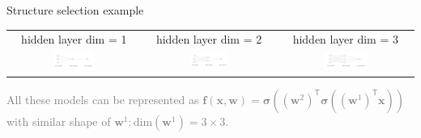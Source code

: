 \documentclass[usenames,dvipsnames,11pt,pdf,utf8,russian,aspectratio=169]{beamer}
\begin{document}
\begin{frame}{Structure selection example}
    \begin{table}
        \centering
        \begin{tabular}{ccc}
            hidden layer dim = 1 &   hidden layer dim = 2 &  hidden layer dim = 3 \\
             \includegraphics[width=0.33\textwidth]{1node.png} &  \includegraphics[width=0.3\textwidth]{2node.png} &  \includegraphics[width=0.33\textwidth]{3node.png} \\
        \end{tabular}


    \end{table}
    \textcolor{gray}{All these models can be represented as $\mathbf{f}(\mathbf{x}, \mathbf{w}) = \boldsymbol{\sigma}\left(\left(\mathbf{w}^2\right)^\mathsf{T}\boldsymbol{\sigma}\left((\mathbf{w}^1)^\mathsf{T}\mathbf{x}\right)\right)$ \\with similar shape of $\mathbf{w}^1: \text{dim}(\mathbf{w}^1) = 3 \times 3.$}
    
\end{frame}
\end{document}
